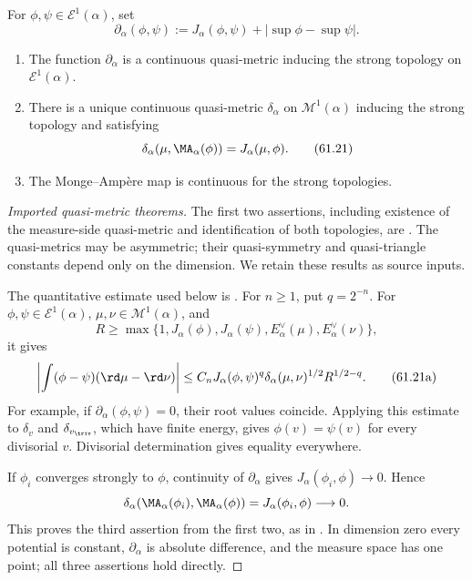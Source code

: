 \begin{definition}
\label{def:mpwn-potential-quasidistance}
For $\phi,\psi\in\mathcal E^1(\alpha)$, set
\[
 \partial_\alpha(\phi,\psi)
 :=J_\alpha(\phi,\psi)+|\sup\phi-\sup\psi|.
\tag{61.20}\label{eq:mpwn-partial-distance}
\]
\end{definition}

\begin{theorem}\label{thm:mpwn-strong-quasimetrics}
\begin{enumerate}
\item The function $\partial_\alpha$ is a continuous quasi-metric
      inducing the strong topology on $\mathcal E^1(\alpha)$.
\item There is a unique continuous quasi-metric
      $\delta_\alpha$ on $\mathcal M^1(\alpha)$ inducing the strong
      topology and satisfying
      \[
       \delta_\alpha(\mu,\MA_\alpha(\phi))
               =J_\alpha(\mu,\phi).
      \tag{61.21}\label{eq:mpwn-measure-quasimetric}
      \]
\item The Monge--Amp\`ere map is continuous for the strong topologies.
\end{enumerate}
\par
\end{theorem}

\begin{proof}[Imported quasi-metric theorems]
The first two assertions, including existence of the
measure-side quasi-metric and identification of both topologies,
are \cite[Theorems~5.2.2 and~5.1.2, pp.~20--22]{MPWN25}.
The quasi-metrics may be asymmetric; their quasi-symmetry and
quasi-triangle constants depend only on the dimension.
We retain these results as source inputs.

The quantitative estimate used below is
\cite[Theorem~5.1.2(2), p.~21]{MPWN25}.  For $n\geq1$, put $q=2^{-n}$.
For $\phi,\psi\in\mathcal E^1(\alpha)$,
$\mu,\nu\in\mathcal M^1(\alpha)$, and
\[
 R\geq\max\{1,J_\alpha(\phi),J_\alpha(\psi),
                        E_\alpha^\vee(\mu),E_\alpha^\vee(\nu)\},
\]
it gives
\[
 \left|\int(\phi-\psi)(\rd\mu-\rd\nu)\right|
 \leq C_n J_\alpha(\phi,\psi)^q
                  \delta_\alpha(\mu,\nu)^{1/2}R^{1/2-q}.
\tag{61.21a}\label{eq:mpwn-mixed-gap-estimate}
\]
For example, if $\partial_\alpha(\phi,\psi)=0$, their root
values coincide.  Applying this estimate to $\delta_v$ and
$\delta_{v_{\triv}}$, which have finite energy, gives
$\phi(v)=\psi(v)$ for every divisorial $v$.  Divisorial
determination gives equality everywhere.

If $\phi_i$ converges strongly to $\phi$, continuity of
$\partial_\alpha$ gives $J_\alpha(\phi_i,\phi)\to0$.  Hence
\[
 \delta_\alpha(\MA_\alpha(\phi_i),\MA_\alpha(\phi))
                   =J_\alpha(\phi_i,\phi)\longrightarrow0.
\]
This proves the third assertion from the first two, as in
\cite[Theorem~5.1.3, p.~21]{MPWN25}.  In dimension zero every potential
is constant, $\partial_\alpha$ is absolute difference, and the
measure space has one point; all three assertions hold directly.
\end{proof}


